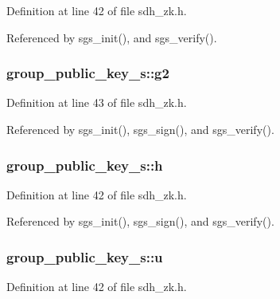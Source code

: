 Definition at line 42 of file sdh\-\_\-zk.\-h.



Referenced by sgs\-\_\-init(), and sgs\-\_\-verify().

\hypertarget{structgroup__public__key__s_ac406c0993076bb75cef25c68ca755330}{
\subsubsection[{g2}]{ group\-\_\-public\-\_\-key\-\_\-s\-::g2}}\label{structgroup__public__key__s_ac406c0993076bb75cef25c68ca755330}


Definition at line 43 of file sdh\-\_\-zk.\-h.



Referenced by sgs\-\_\-init(), sgs\-\_\-sign(), and sgs\-\_\-verify().

\hypertarget{structgroup__public__key__s_a470bf1df131a6f861f4439e52e49f349}{
\subsubsection[{h}]{ group\-\_\-public\-\_\-key\-\_\-s\-::h}}\label{structgroup__public__key__s_a470bf1df131a6f861f4439e52e49f349}


Definition at line 42 of file sdh\-\_\-zk.\-h.



Referenced by sgs\-\_\-init(), sgs\-\_\-sign(), and sgs\-\_\-verify().

\hypertarget{structgroup__public__key__s_afe10241d021cdf5ff24d9827f82e3795}{
\subsubsection[{u}]{ group\-\_\-public\-\_\-key\-\_\-s\-::u}}\label{structgroup__public__key__s_afe10241d021cdf5ff24d9827f82e3795}


Definition at line 42 of file sdh\-\_\-zk.\-h.



